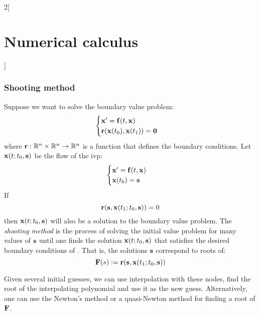 \documentclass[../../../main_math.tex]{subfiles}
\begin{document}
\begin{multicols}{2}[\section{Numerical calculus}]
  \subsubsection{Shooting method}
  \begin{definition}
    Suppose we want to solve the boundary value problem:
    \begin{equation}\label{NC:bvp}
      \begin{cases}
        \boldsymbol{\mathrm{x}}' =\boldsymbol{\mathrm{f}}(t, \boldsymbol{\mathrm{x}}) \\
        \boldsymbol{\mathrm{r}}(\boldsymbol{\mathrm{x}}(t_0), \boldsymbol{\mathrm{x}}(t_1))=\boldsymbol{\mathrm{0}}
      \end{cases}
    \end{equation}
    where $\boldsymbol{\mathrm{r}}: \mathbb{R}^n\times\mathbb{R}^n\rightarrow\mathbb{R}^n$ is a function that defines the boundary conditions.
    Let $\boldsymbol{\mathrm{x}}(t;t_0,\boldsymbol{\mathrm{s}})$ be the flow of the ivp:
    \begin{equation*}
      \begin{cases}
        \boldsymbol{\mathrm{x}}' =\boldsymbol{\mathrm{f}}(t, \boldsymbol{\mathrm{x}}) \\
        \boldsymbol{\mathrm{x}}(t_0)=\boldsymbol{\mathrm{s}}
      \end{cases}
    \end{equation*}
    If
    \begin{equation}\label{NC:eq_shooting_bound}
      \boldsymbol{\mathrm{r}}(\boldsymbol{\mathrm{s}}, \boldsymbol{\mathrm{x}}(t_1;t_0,\boldsymbol{\mathrm{s}}))=0
    \end{equation}
    then $\boldsymbol{\mathrm{x}}(t;t_0,\boldsymbol{\mathrm{s}})$ will also be a solution to the boundary value problem. The \emph{shooting method} is the process of solving the initial value problem for many values of $\boldsymbol{\mathrm{s}}$ until one finds the solution $\boldsymbol{\mathrm{x}}(t;t_0,\boldsymbol{\mathrm{s}})$ that satisfies the desired boundary conditions of . That is, the solutions $\boldsymbol{\mathrm{s}}$ correspond to roots of:
    $$
      \boldsymbol{\mathrm{F}}(s):=\boldsymbol{\mathrm{r}}(\boldsymbol{\mathrm{s}},\boldsymbol{\mathrm{x}}(t_1;t_0,\boldsymbol{\mathrm{s}}))
    $$
  \end{definition}
  \begin{remark}
    Given several initial guesses, we can use interpolation with these nodes, find the root of the interpolating polynomial and use it as the new guess. Alternatively, one can use the Newton's method or a quasi-Newton method for finding a root of $\boldsymbol{\mathrm{F}}$.
  \end{remark}

\end{multicols}
\end{document}
